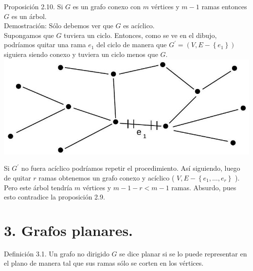 \documentclass[10pt]{article}
\begin{document}
Proposición 2.10. Si $G$ es un grafo conexo con $m$ vértices y $m-1$ ramas entonces $G$ es un árbol.\\
Demostración: Sólo debemos ver que $G$ es acíclico.\\
Supongamos que $G$ tuviera un ciclo. Entonces, como se ve en el dibujo, podríamos quitar una rama $e_{1}$ del ciclo de manera que $G^{\prime}=\left(V, E-\left\{e_{1}\right\}\right)$ siguiera siendo conexo y tuviera un ciclo menos que $G$.\\
\includegraphics[max width=\textwidth, center]{2025_09_05_93c7c1835f249f70c0eeg-05(2)}

Si $G^{\prime}$ no fuera acíclico podríamos repetir el procedimiento. Así siguiendo, luego de quitar $r$ ramas obtenemos un grafo conexo y acíclico ( $V, E-\left\{e_{1}, \ldots, e_{r}\right\}$ ). Pero este árbol tendría $m$ vértices y $m-1-r<m-1$ ramas. Absurdo, pues esto contradice la proposición 2.9.

\section*{3. Grafos planares.}
Definición 3.1. Un grafo no dirigido $G$ se dice planar si se lo puede representar en el plano de manera tal que sus ramas sólo se corten en los vértices.
\end{document}
